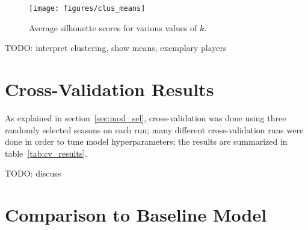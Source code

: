 \begin{figure}
    \centering
    \texttt{[image: figures/clus\_means]}
    \caption{Average silhouette scores for various values of $k$.}
    \label{fig:sils}
\end{figure}

TODO: interpret clustering, show means, exemplary players

\section{Cross-Validation Results}

As explained in section~\ref{sec:mod_sel}, cross-validation was done using three
randomly selected seasons on each run; many different cross-validation runs were
done in order to tune model hyperparameters; the results are summarized in
table~\ref{tab:cv_results}.

\begin{table}
    \centering
    \noindent{}
    \caption{A summary of the results of hyperparameter tuning and
    cross-validation.}
    \label{tab:cv_results}
\end{table}

TODO: discuss

\section{Comparison to Baseline Model}

